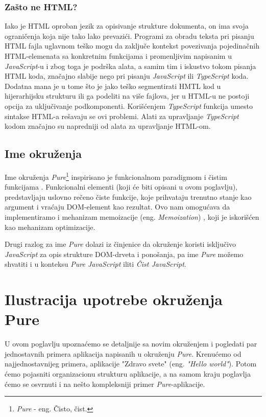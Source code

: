 \documentclass[12pt,oneside]{memoir}
\begin{document}
\subsection{Zašto ne HTML?} \label{subsec:zasto-ne-html}
Iako je HTML oproban jezik za opisivanje strukture dokumenta, on ima svoja ograničenja koja nije tako lako prevazići.
Programi za obradu teksta pri pisanju HTML fajla uglavnom teško mogu da zaključe kontekst povezivanja
pojedinačnih HTML-elemenata sa konkretnim funkcijama i promenljivim napisanim u \emph{JavaScript}-u i zbog toga je podrška alata,
a samim tim i iskustvo tokom pisanja HTML koda, značajno slabije nego pri pisanju \emph{JavaScript} ili \emph{TypeScript} koda.
Dodatna mana je u tome što je jako teško segmentirati HMTL kod u hijerarhijsku strukturu ili ga podeliti na više fajlova,
jer u HTML-u ne postoji opcija za uključivanje podkomponenti.
Korišćenjem \emph{TypeScript} funkcija umesto sintakse HTML-a rešavaju se ovi problemi.
Alati za upravljanje \emph{TypeScript} kodom značajno su napredniji od alata za upravljanje HTML-om.

\section{Ime okruženja}
Ime okruženja \emph{Pure}\footnote{\emph{Pure} - eng. Čisto, čist.} inspirisano je 
funkcionalnom paradigmom i čistim funkcijama \cite{functionalProgramming}. Funkcionalni elementi (koji će biti opisani u ovom poglavlju),
predstavljaju uslovno rečeno čiste funkcije, koje prihvataju trenutno stanje kao argument i vraćaju
DOM-element kao rezultat. Ovo nam omogućava da implementiramo i mehanizam memoizacije (eng. \emph{Memoization}) \cite{functionalProgramming},
koji je iskorišćen kao mehanizam optimizacije.

Drugi razlog za ime \emph{Pure} dolazi iz činjenice da okruženje koristi isključivo \emph{JavaScript}
za opis strukture DOM-drveta i ponošanja, pa ime \emph{Pure} možemo shvatiti i u konteksu \emph{Pure JavaScript} iliti \emph{Čist JavaScript}.

\chapter{Ilustracija upotrebe okruženja Pure}\label{chap:pure-okruzenje}
U ovom poglavlju upoznaćemo se detaljnije sa novim okruženjem i pogledati par jednostavnih
primera aplikacija napisanih u okruženju \emph{Pure}.
Krenućemo od najjednostavnijeg
primera, aplikacije "Zdravo svete" (eng. \emph{"Hello world"}).
Potom ćemo pojasniti organizacionu strukturu aplikacije, 
a na samom kraju poglavlja ćemo se osvrnuti i na nešto kompleksniji primer \emph{Pure}-aplikacije.
\end{document}
